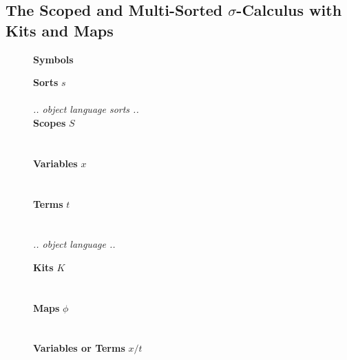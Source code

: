 \documentclass[screen,nonacm]{acmart}
\begin{document}
\subsection{The Scoped and Multi-Sorted $\sigma$-Calculus with Kits and Maps}\label{sec:ags-rls}
\begin{figure}[tp]
      \centering
      \small
      {\raggedright \textbf{\Large Symbols} \par}
      \vspace{1.5em}

      \begin{minipage}[t]{0.48\textwidth}
            \raggedright{}
            \textbf{Sorts} $s$ \\
            \ESortTy{}\\
            \vspace{0.5em}
            \emph{.. object language sorts ..}\\
            \vspace{0.5em}
            \textbf{Scopes} $S$ \\
            \EScopeDefTy{}\\
            \vspace{0.5em}
            \EScopeDef{}\\
            \vspace{0.5em}
            \textbf{Variables} $x$ \\
            \EVarsTy{}\\
            \vspace{0.5em}
            \EVars{}\\
            \vspace{0.5em}
            \textbf{Terms} $t$ \\
            \ETmC{}\\
            \vspace{0.5em}
            \EVarC{}\\
            \emph{.. object language  ..}\\
            \vspace{1.0em}
      \end{minipage}
      \hfill
      \begin{minipage}[t]{0.48\textwidth}
            \raggedright{}
            \textbf{Kits} $K$ \\
            \EKitDefTy{}\\
            \vspace{0.5em}
            \EKitDef{}\\
            \vspace{0.5em}
            \textbf{Maps} $ϕ$\\
            \EPrimsTy{}\\
            \vspace{0.5em}
            \EPrims{}\\
            \vspace{0.5em}
            \textbf{Variables or Terms} $x/t$\\
            \EVarTrmTy{}\\
            \vspace{0.5em}
            \EVarTrmApp{}
      \end{minipage}


\end{figure}
\end{document}
